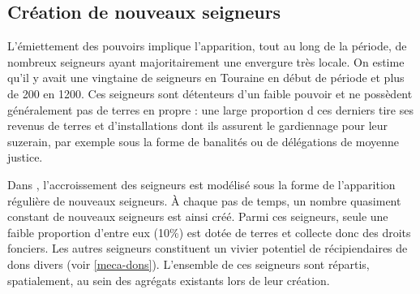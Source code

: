 %	
%



\subsection{Création de nouveaux seigneurs}

L'émiettement des pouvoirs implique l'apparition, tout au long de la période, de nombreux seigneurs ayant majoritairement une envergure très locale.
On estime qu'il y avait une vingtaine de seigneurs en Touraine en début de période et plus de 200 en 1200.
Ces seigneurs sont détenteurs d'un faible pouvoir et ne possèdent généralement pas de terres \og en propre\fg{} : une large proportion d ces derniers tire ses revenus de terres et d'installations dont ils assurent le gardiennage pour leur suzerain, par exemple sous la forme de banalités ou de délégations de moyenne justice.

\begin{tcolorbox}[breakable,left=0pt,right=0pt,top=0pt,bottom=0pt,
	colback=gray!15,colframe=gray!15,width=\dimexpr\textwidth\relax, 
	enlarge left by=0mm, boxsep=5pt,arc=0pt,outer arc=0pt]
Dans \simfeodal{}, l'accroissement des seigneurs est modélisé sous la forme de l'apparition régulière de nouveaux seigneurs.
À chaque pas de temps, un nombre quasiment constant\footnotemark{} de nouveaux seigneurs est ainsi créé.
Parmi ces seigneurs, seule une faible proportion d'entre eux (10\%) est dotée de terres et collecte donc des droits fonciers.
Les autres seigneurs constituent un vivier potentiel de récipiendaires de dons divers (voir \cref{meca-dons}).
L'ensemble de ces seigneurs sont répartis, spatialement, au sein des agrégats existants lors de leur création.
\end{tcolorbox}

